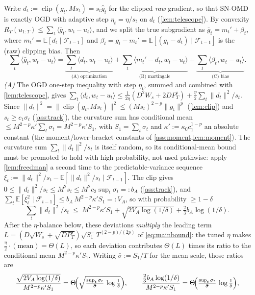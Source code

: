 \documentclass{article}
\newcommand{\E}{\mathbb{E}}
\newcommand{\ip}[2]{\langle #1, #2 \rangle}
\newcommand{\norm}[1]{\lVert #1 \rVert}
\newcommand{\gt}{g_t}
\newcommand{\clip}{\operatorname{clip}}
\begin{document}
Write $d_t:=\clip(\gt,Ms_t)=s_t\hat g_t$ for the clipped \emph{raw} gradient, so that
SN-OMD is exactly OGD with adaptive step $\eta_t=\eta/s_t$ on $d_t$
(\cref{lem:telescope}). By convexity $R_T(u_{1:T})\le\sum_t\ip{\bar g_t}{w_t-u_t}$, and
we split the true subgradient as $\bar g_t=m_t'+\beta_t$, where
$m_t'=\E[d_t\mid\mathcal F_{t-1}]$ and $\beta_t=\bar g_t-m_t'=\E[(\gt-d_t)\mid
\mathcal F_{t-1}]$ is the (raw) clipping bias. Then
\begin{equation*}
\sum_t\ip{\bar g_t}{w_t-u_t}
=\underbrace{\sum_t\ip{d_t}{w_t-u_t}}_{\text{(A) optimization}}
+\underbrace{\sum_t\ip{m_t'-d_t}{w_t-u_t}}_{\text{(B) martingale}}
+\underbrace{\sum_t\ip{\beta_t}{w_t-u_t}}_{\text{(C) bias}}.
\end{equation*}
\emph{(A)} The OGD one-step inequality with step $\eta_t$, summed and combined with
\cref{lem:telescope}, gives
$\sum_t\ip{d_t}{w_t-u_t}\le\tfrac{1}{2\eta}(D^2W_s+2D P_T^s)+\tfrac{\eta}{2}
\sum_t\norm{d_t}^2/s_t$. Since $\norm{d_t}^2=\norm{\clip(\gt,Ms_t)}^2\le
(Ms_t)^{2-p}\norm{\gt}^p$ (\cref{lem:clip}) and $s_t\ge c_1\sigma_t$
(\cref{ass:track}), the curvature sum has conditional mean
$\le M^{2-p}\kappa'\sum_t\sigma_t=M^{2-p}\kappa'S_1$, with $S_1=\sum_t\sigma_t$ and
$\kappa'{:=}\kappa_0 c_1^{1-p}$ an absolute constant (the moment/lower-bracket constants of
\cref{ass:moment,lem:moment}). The curvature sum $\sum_t\norm{d_t}^2/s_t$ is itself random,
so its conditional-mean bound must be promoted to hold with high probability, not used
pathwise: apply \cref{lem:freedman} a second time to the predictable-variance sequence
$\xi_t:=\norm{d_t}^2/s_t-\E[\norm{d_t}^2/s_t\mid\mathcal F_{t-1}]$. The clip gives
$0\le\norm{d_t}^2/s_t\le M^2 s_t\le M^2 c_2\sup_t\sigma_t=:b_A$ (\cref{ass:track}), and
$\sum_t\E[\xi_t^2\mid\mathcal F_{t-1}]\le b_A\,M^{2-p}\kappa'S_1=:V_A$, so with probability
$\ge1-\delta$
\[
  \sum_t\norm{d_t}^2/s_t\;\le\;M^{2-p}\kappa'S_1
   +\sqrt{2V_A\log(1/\delta)}+\tfrac{2}{3}b_A\log(1/\delta).
\]
After the $\eta$-balance below, these deviations \emph{multiply} the leading term
$L=(D\sqrt{W_s}+\sqrt{D P_T^s})\sqrt{S_1}\,T^{(2-p)/(2p)}$ of \eqref{eq:mainbound}: the tuned
$\eta$ makes $\tfrac{\eta}{2}\cdot(\text{mean})=\Theta(L)$, so each deviation contributes
$\Theta(L)$ times its ratio to the conditional mean $M^{2-p}\kappa'S_1$. Writing
$\bar\sigma:=S_1/T$ for the mean scale, those ratios are
\[
\frac{\sqrt{2V_A\log(1/\delta)}}{M^{2-p}\kappa'S_1}
 =\Theta\!\Bigl(\sqrt{\tfrac{\sup_t\sigma_t}{\bar\sigma}\,\log\tfrac1\delta}\Bigr),
\qquad
\frac{\tfrac23 b_A\log(1/\delta)}{M^{2-p}\kappa'S_1}
 =\Theta\!\Bigl(\tfrac{\sup_t\sigma_t}{\bar\sigma}\,\log\tfrac1\delta\Bigr),
\]
\end{document}
